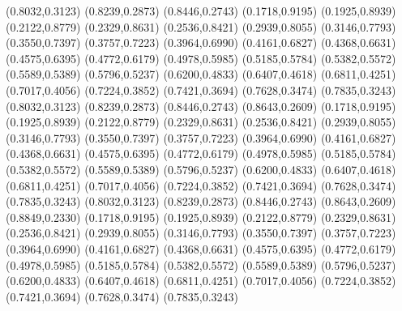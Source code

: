 \PST@Diamond(0.8032,0.3123)
\PST@Diamond(0.8239,0.2873)
\PST@Diamond(0.8446,0.2743)
\PST@Diamond(0.1718,0.9195)
\PST@Diamond(0.1925,0.8939)
\PST@Diamond(0.2122,0.8779)
\PST@Diamond(0.2329,0.8631)
\PST@Diamond(0.2536,0.8421)
\PST@Diamond(0.2939,0.8055)
\PST@Diamond(0.3146,0.7793)
\PST@Diamond(0.3550,0.7397)
\PST@Diamond(0.3757,0.7223)
\PST@Diamond(0.3964,0.6990)
\PST@Diamond(0.4161,0.6827)
\PST@Diamond(0.4368,0.6631)
\PST@Diamond(0.4575,0.6395)
\PST@Diamond(0.4772,0.6179)
\PST@Diamond(0.4978,0.5985)
\PST@Diamond(0.5185,0.5784)
\PST@Diamond(0.5382,0.5572)
\PST@Diamond(0.5589,0.5389)
\PST@Diamond(0.5796,0.5237)
\PST@Diamond(0.6200,0.4833)
\PST@Diamond(0.6407,0.4618)
\PST@Diamond(0.6811,0.4251)
\PST@Diamond(0.7017,0.4056)
\PST@Diamond(0.7224,0.3852)
\PST@Diamond(0.7421,0.3694)
\PST@Diamond(0.7628,0.3474)
\PST@Diamond(0.7835,0.3243)
\PST@Diamond(0.8032,0.3123)
\PST@Diamond(0.8239,0.2873)
\PST@Diamond(0.8446,0.2743)
\PST@Diamond(0.8643,0.2609)
\PST@Diamond(0.1718,0.9195)
\PST@Diamond(0.1925,0.8939)
\PST@Diamond(0.2122,0.8779)
\PST@Diamond(0.2329,0.8631)
\PST@Diamond(0.2536,0.8421)
\PST@Diamond(0.2939,0.8055)
\PST@Diamond(0.3146,0.7793)
\PST@Diamond(0.3550,0.7397)
\PST@Diamond(0.3757,0.7223)
\PST@Diamond(0.3964,0.6990)
\PST@Diamond(0.4161,0.6827)
\PST@Diamond(0.4368,0.6631)
\PST@Diamond(0.4575,0.6395)
\PST@Diamond(0.4772,0.6179)
\PST@Diamond(0.4978,0.5985)
\PST@Diamond(0.5185,0.5784)
\PST@Diamond(0.5382,0.5572)
\PST@Diamond(0.5589,0.5389)
\PST@Diamond(0.5796,0.5237)
\PST@Diamond(0.6200,0.4833)
\PST@Diamond(0.6407,0.4618)
\PST@Diamond(0.6811,0.4251)
\PST@Diamond(0.7017,0.4056)
\PST@Diamond(0.7224,0.3852)
\PST@Diamond(0.7421,0.3694)
\PST@Diamond(0.7628,0.3474)
\PST@Diamond(0.7835,0.3243)
\PST@Diamond(0.8032,0.3123)
\PST@Diamond(0.8239,0.2873)
\PST@Diamond(0.8446,0.2743)
\PST@Diamond(0.8643,0.2609)
\PST@Diamond(0.8849,0.2330)
\PST@Diamond(0.1718,0.9195)
\PST@Diamond(0.1925,0.8939)
\PST@Diamond(0.2122,0.8779)
\PST@Diamond(0.2329,0.8631)
\PST@Diamond(0.2536,0.8421)
\PST@Diamond(0.2939,0.8055)
\PST@Diamond(0.3146,0.7793)
\PST@Diamond(0.3550,0.7397)
\PST@Diamond(0.3757,0.7223)
\PST@Diamond(0.3964,0.6990)
\PST@Diamond(0.4161,0.6827)
\PST@Diamond(0.4368,0.6631)
\PST@Diamond(0.4575,0.6395)
\PST@Diamond(0.4772,0.6179)
\PST@Diamond(0.4978,0.5985)
\PST@Diamond(0.5185,0.5784)
\PST@Diamond(0.5382,0.5572)
\PST@Diamond(0.5589,0.5389)
\PST@Diamond(0.5796,0.5237)
\PST@Diamond(0.6200,0.4833)
\PST@Diamond(0.6407,0.4618)
\PST@Diamond(0.6811,0.4251)
\PST@Diamond(0.7017,0.4056)
\PST@Diamond(0.7224,0.3852)
\PST@Diamond(0.7421,0.3694)
\PST@Diamond(0.7628,0.3474)
\PST@Diamond(0.7835,0.3243)
